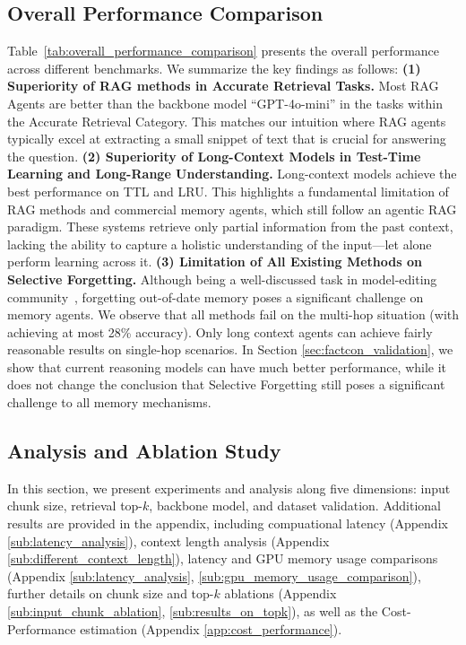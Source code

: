 \subsection{Overall Performance Comparison}
Table~\ref{tab:overall_performance_comparison} presents the overall performance across different benchmarks. We summarize the key findings as follows: \textbf{(1) Superiority of RAG methods in Accurate Retrieval Tasks.} Most RAG Agents are better than the backbone model ``GPT-4o-mini'' in the tasks within the Accurate Retrieval Category. This matches our intuition where RAG agents typically excel at extracting a small snippet of text that is crucial for answering the question. \textbf{(2) Superiority of Long-Context Models in Test-Time Learning and Long-Range Understanding.} Long-context models achieve the best performance on TTL and LRU. This highlights a fundamental limitation of RAG methods and commercial memory agents, which still follow an agentic RAG paradigm. These systems retrieve only partial information from the past context, lacking the ability to capture a holistic understanding of the input—let alone perform learning across it. \textbf{(3) Limitation of All Existing Methods on Selective Forgetting.} Although being a well-discussed task in model-editing community~\citep{SERAC,alphaedit}, forgetting out-of-date memory poses a significant challenge on memory agents. We observe that all methods fail on the multi-hop situation (with achieving at most 28\% accuracy). Only long context agents can achieve fairly reasonable results on single-hop scenarios. In Section \ref{sec:factcon_validation}, we show that current reasoning models can have much better performance, while it does not change the conclusion that Selective Forgetting still poses a significant challenge to all memory mechanisms. 



\subsection{Analysis and Ablation Study}

In this section, we present experiments and analysis along five dimensions: input chunk size, retrieval top-$k$, backbone model, and dataset validation. Additional results are provided in the appendix, including compuational latency (Appendix \ref{sub:latency_analysis}), context length analysis (Appendix \ref{sub:different_context_length}), latency and GPU memory usage comparisons (Appendix \ref{sub:latency_analysis}, \ref{sub:gpu_memory_usage_comparison}),  further details on chunk size and top-$k$ ablations (Appendix \ref{sub:input_chunk_ablation}, \ref{sub:results_on_topk}), as well as the Cost-Performance estimation (Appendix \ref{app:cost_performance}).




